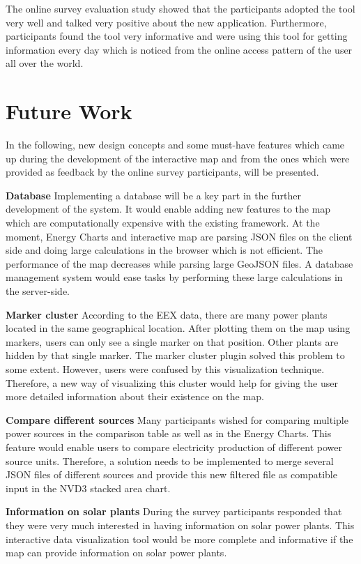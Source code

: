 The online survey evaluation study showed that the participants adopted the tool very well and talked very positive about the new application. Furthermore, participants found the tool very informative and were using this tool for getting information every day which is noticed from the online access pattern of the user all over the world.

\section*{Future Work}

In the following, new design concepts and some must-have features which came up during the development of the interactive map and from the ones which were provided as feedback by the online survey participants, will be presented. 

\textbf{Database}
\newline
Implementing a database will be a key part in the further development of the system. It would enable adding new features to the map which are computationally expensive with the existing framework. At the moment, Energy Charts and interactive map are parsing JSON files on the client side and doing large calculations in the browser which is not efficient. The performance of the map decreases while parsing large GeoJSON files. A database management system would ease tasks by performing these large calculations in the server-side.

\textbf{Marker cluster}
\newline
According to the EEX data, there are many power plants located in the same geographical location. After plotting them on the map using markers, users can only see a single marker on that position. Other plants are hidden by that single marker. The marker cluster plugin solved this problem to some extent. However, users were confused by this visualization technique. Therefore, a new way of visualizing this cluster would help for giving the user more detailed information about their existence on the map.

\textbf{Compare different sources}
\newline
Many participants wished for comparing multiple power sources in the comparison table as well as in the Energy Charts. This feature would enable users to compare electricity production of different power source units. Therefore, a solution needs to be implemented to merge several JSON files of different sources and provide this new filtered file as compatible input in the NVD3 stacked area chart. 

\textbf{Information on solar plants}
\newline
During the survey participants responded that they were very much interested in having information on solar power plants. This interactive data visualization tool would be more complete and informative if the map can provide information on solar power plants. 

